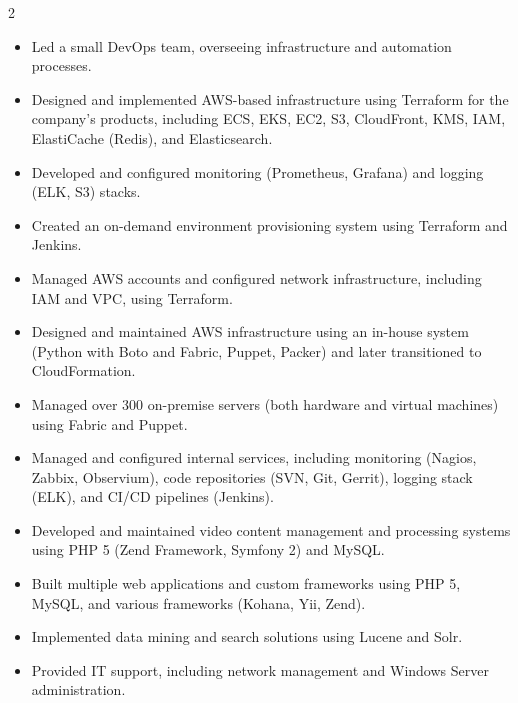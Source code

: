 \documentclass[10pt,a4paper,ragged2e,withhyper]{altacv}
\begin{document}
\begin{paracol}{2}
\divider

\begin{itemize}
\item Led a small DevOps team, overseeing infrastructure and automation processes.
\item Designed and implemented AWS-based infrastructure using Terraform for the company's products, including ECS, EKS, EC2, S3, CloudFront, KMS, IAM, ElastiCache (Redis), and Elasticsearch.
\item Developed and configured monitoring (Prometheus, Grafana) and logging (ELK, S3) stacks.
\item Created an on-demand environment provisioning system using Terraform and Jenkins.
\item Managed AWS accounts and configured network infrastructure, including IAM and VPC, using Terraform.
\end{itemize}

\divider

\begin{itemize}
\item Designed and maintained AWS infrastructure using an in-house system (Python with Boto and Fabric, Puppet, Packer) and later transitioned to CloudFormation.
\item Managed over 300 on-premise servers (both hardware and virtual machines) using Fabric and Puppet.
\item Managed and configured internal services, including monitoring (Nagios, Zabbix, Observium), code repositories (SVN, Git, Gerrit), logging stack (ELK), and CI/CD pipelines (Jenkins).
\end{itemize}

\divider

\begin{itemize}
\item Developed and maintained video content management and processing systems using PHP 5 (Zend Framework, Symfony 2) and MySQL.
\end{itemize}

\divider

\begin{itemize}
\item Built multiple web applications and custom frameworks using PHP 5, MySQL, and various frameworks (Kohana, Yii, Zend).
\item Implemented data mining and search solutions using Lucene and Solr.
\item Provided IT support, including network management and Windows Server administration.
\end{itemize}


\end{paracol}
\end{document}

